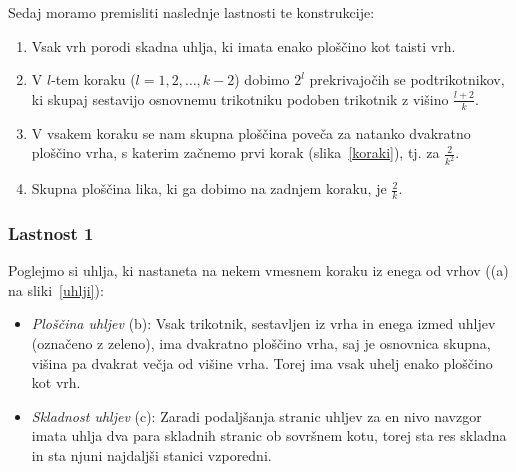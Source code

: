 \documentclass[a4paper, 12pt]{article}
\begin{document}
\noindent Sedaj moramo premisliti naslednje lastnosti te konstrukcije:

\begin{enumerate}
    \item Vsak vrh porodi skadna uhlja, ki imata enako ploščino kot taisti vrh.
    \item V $ l $-tem koraku ($ l = 1, 2, \ldots, k-2 $) dobimo $ 2^l $ prekrivajočih se podtrikotnikov, ki skupaj sestavijo osnovnemu trikotniku podoben trikotnik z višino $ \frac{l+2}{k} $.
    \item V vsakem koraku se nam skupna ploščina poveča za natanko dvakratno ploščino vrha, s katerim začnemo prvi korak (slika~\ref{koraki}), tj. za $ \frac{2}{k^2} $.
    \item Skupna ploščina lika, ki ga dobimo na zadnjem koraku, je $ \frac{2}{k} $.
\end{enumerate}


\subsubsection*{Lastnost 1}

Poglejmo si uhlja, ki nastaneta na nekem vmesnem koraku iz enega od vrhov ((a) na sliki~\ref{uhlji}):

\begin{itemize}
    \item \emph{Ploščina uhljev} (b): Vsak trikotnik, sestavljen iz vrha in enega izmed uhljev (označeno z zeleno), ima dvakratno ploščino vrha, saj je osnovnica skupna, višina pa dvakrat večja od višine vrha. Torej ima vsak uhelj enako ploščino kot vrh.
    \item \emph{Skladnost uhljev} (c): Zaradi podaljšanja stranic uhljev za en nivo navzgor imata uhlja dva para skladnih stranic ob sovršnem kotu, torej sta res skladna in sta njuni najdaljši stanici vzporedni.
\end{itemize}
\end{document}
